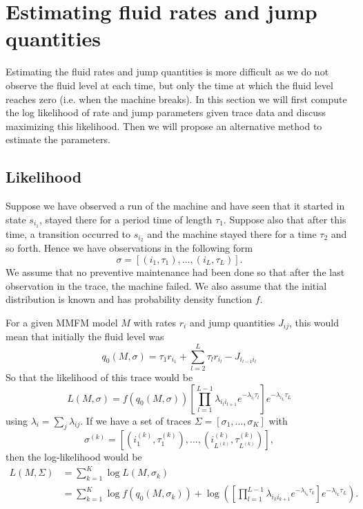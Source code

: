 \section{Estimating fluid rates and jump quantities}
Estimating the fluid rates and jump quantities is more difficult as we do not observe the fluid level at each time, but only the time at which the fluid level reaches zero (i.e. when the machine breaks).
In this section we will first compute the log likelihood of rate and jump parameters given trace data and discuss maximizing this likelihood.
Then we will propose an alternative method to estimate the parameters.

\subsection{Likelihood}
Suppose we have observed a run of the machine and have seen that it started in state $s_{i_1}$, stayed there for a period time of length $\tau_1$.
Suppose also that after this time, a transition occurred to $s_{i_2}$ and the machine stayed there for a time $\tau_2$ and so forth.
Hence we have observations in the following form
$$
\sigma=\left[(i_1,\tau_1),...,(i_L,\tau_L)\right].
$$
We assume that no preventive maintenance had been done so that after the last observation in the trace, the machine failed.
We also assume that the initial distribution is known and has probability density function $f$.

For a given MMFM model $M$ with rates $r_i$ and jump quantities $J_{ij}$, this would mean that initially the fluid level was
\begin{equation}\label{eq:initialLevelDefinition}
q_0(M,\sigma)=\tau_1r_{i_1}+\sum\limits_{l=2}^{L}\tau_lr_{i_l}-J_{i_{l-1}i_l}
\end{equation}
So that the likelihood of this trace would be
$$
L(M,\sigma)=f(q_0(M,\sigma))\left[\prod\limits_{l=1}^{L-1}\lambda_{i_li_{l+1}}e^{-\lambda_{i_l}\tau_l}\right]e^{-\lambda_{i_L}\tau_L}
$$
using $\lambda_i=\sum_j\lambda_{ij}$.
If we have a set of traces $\Sigma=[\sigma_1,...,\sigma_K]$ with \[
\sigma^{(k)}=\left[(i_1^{(k)},\tau_1^{(k)}),...,(i_{L^{(k)}}^{(k)},\tau_{L^{(k)}}^{(k)})\right],
\]
then the log-likelihood would be
\begin{equation}\label{eq:MmfmLikelihood}
\begin{split}
L(M,\Sigma)&=\sum\limits_{k=1}^K\log L(M,\sigma_k)\\
&=\sum\limits_{k=1}^K\log f(q_0(M,\sigma_k))+\log\left(\left[\prod\limits_{l=1}^{L-1}\lambda_{i_ki_{k+1}}e^{-\lambda_{i_k}\tau_k}\right]e^{-\lambda_{i_L}\tau_L}\right).
\end{split}
\end{equation}

